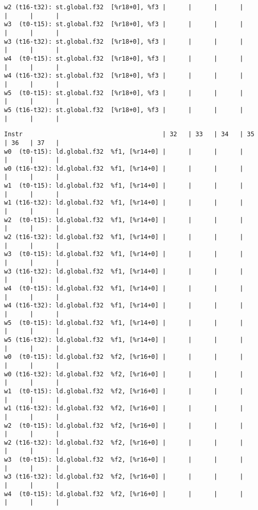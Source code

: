 \documentclass[11pt]{article}
\begin{document}
\begin{Answer}
\begin{verbatim}
w2 (t16-t32): st.global.f32  [%r18+0], %f3 |      |      |      |      |      |      |
w3  (t0-t15): st.global.f32  [%r18+0], %f3 |      |      |      |      |      |      |
w3 (t16-t32): st.global.f32  [%r18+0], %f3 |      |      |      |      |      |      |
w4  (t0-t15): st.global.f32  [%r18+0], %f3 |      |      |      |      |      |      |
w4 (t16-t32): st.global.f32  [%r18+0], %f3 |      |      |      |      |      |      |
w5  (t0-t15): st.global.f32  [%r18+0], %f3 |      |      |      |      |      |      |
w5 (t16-t32): st.global.f32  [%r18+0], %f3 |      |      |      |      |      |      |
\end{verbatim}
	\newpage
	\begin{verbatim}
Instr                                      | 32   | 33   | 34   | 35   | 36   | 37   |
w0  (t0-t15): ld.global.f32  %f1, [%r14+0] |      |      |      |      |      |      |
w0 (t16-t32): ld.global.f32  %f1, [%r14+0] |      |      |      |      |      |      |
w1  (t0-t15): ld.global.f32  %f1, [%r14+0] |      |      |      |      |      |      |
w1 (t16-t32): ld.global.f32  %f1, [%r14+0] |      |      |      |      |      |      |
w2  (t0-t15): ld.global.f32  %f1, [%r14+0] |      |      |      |      |      |      |
w2 (t16-t32): ld.global.f32  %f1, [%r14+0] |      |      |      |      |      |      |
w3  (t0-t15): ld.global.f32  %f1, [%r14+0] |      |      |      |      |      |      |
w3 (t16-t32): ld.global.f32  %f1, [%r14+0] |      |      |      |      |      |      |
w4  (t0-t15): ld.global.f32  %f1, [%r14+0] |      |      |      |      |      |      |
w4 (t16-t32): ld.global.f32  %f1, [%r14+0] |      |      |      |      |      |      |
w5  (t0-t15): ld.global.f32  %f1, [%r14+0] |      |      |      |      |      |      |
w5 (t16-t32): ld.global.f32  %f1, [%r14+0] |      |      |      |      |      |      |
w0  (t0-t15): ld.global.f32  %f2, [%r16+0] |      |      |      |      |      |      |
w0 (t16-t32): ld.global.f32  %f2, [%r16+0] |      |      |      |      |      |      |
w1  (t0-t15): ld.global.f32  %f2, [%r16+0] |      |      |      |      |      |      |
w1 (t16-t32): ld.global.f32  %f2, [%r16+0] |      |      |      |      |      |      |
w2  (t0-t15): ld.global.f32  %f2, [%r16+0] |      |      |      |      |      |      |
w2 (t16-t32): ld.global.f32  %f2, [%r16+0] |      |      |      |      |      |      |
w3  (t0-t15): ld.global.f32  %f2, [%r16+0] |      |      |      |      |      |      |
w3 (t16-t32): ld.global.f32  %f2, [%r16+0] |      |      |      |      |      |      |
w4  (t0-t15): ld.global.f32  %f2, [%r16+0] |      |      |      |      |      |      |

\end{verbatim}
\end{Answer}
\end{document}
